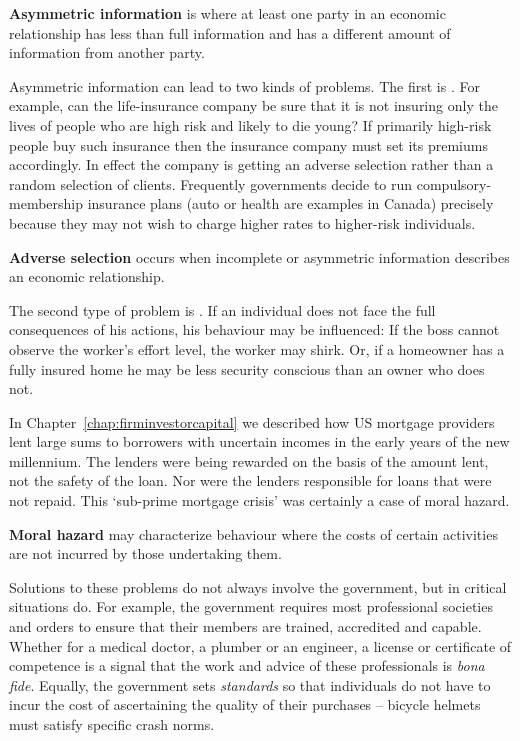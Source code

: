 \begin{DefBox}
\textbf{Asymmetric information} is where at least one party in an economic relationship has less than full information and has a different amount of information from another party.
\end{DefBox}

Asymmetric information can lead to two kinds of problems. The first is . For example, can the life-insurance company be sure that it is not insuring only the lives of people who are high risk and likely to die young? If primarily high-risk people buy such insurance then the insurance company must set its premiums accordingly. In effect the company is getting an adverse selection rather than a random selection of clients. Frequently governments decide to run compulsory-membership insurance plans (auto or health are examples in Canada) precisely because they may not wish to charge higher rates to higher-risk individuals.  

\begin{DefBox}
\textbf{Adverse selection} occurs when incomplete or asymmetric information describes an economic relationship.
\end{DefBox}

The second type of problem is . If an individual does not face the full consequences of his actions, his behaviour may be influenced: If the boss cannot observe the worker's effort level, the worker may shirk. Or, if a homeowner has a fully insured home he may be less security conscious than an owner who does not. 

In Chapter~\ref{chap:firminvestorcapital} we described how US mortgage providers lent large sums to borrowers with uncertain incomes in the early years of the new millennium. The lenders were being rewarded on the basis of the amount lent, not the safety of the loan. Nor were the lenders responsible for loans that were not repaid. This `sub-prime mortgage crisis' was certainly a case of moral hazard.

\begin{DefBox}
\textbf{Moral hazard} may characterize behaviour where the costs of certain activities are not incurred by those undertaking them.
\end{DefBox}

Solutions to these problems do not always involve the government, but in critical situations do. For example, the government requires most professional societies and orders to ensure that their members are trained, accredited and capable. Whether for a medical doctor, a plumber or an engineer, a license or certificate of competence is a signal that the work and advice of these professionals is \textit{bona fide}. Equally, the government sets \textit{standards} so that individuals do not have to incur the cost of ascertaining the quality of their purchases -- bicycle helmets must satisfy specific crash norms.

